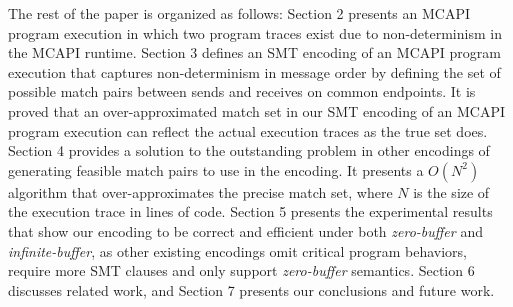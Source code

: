 The rest of the paper is organized as follows:
Section 2 presents an MCAPI program execution in which two program traces exist due to non-determinism in the MCAPI runtime. Section 3 defines an SMT encoding of an MCAPI program execution that captures non-determinism in message order by defining the set of possible match pairs between sends and receives on common endpoints. It is proved that an over-approximated match set in our SMT encoding of an MCAPI program execution can reflect the actual execution traces as the true set does. Section 4 provides a solution to the outstanding problem in other encodings of generating feasible match pairs to use in the encoding. It presents a $O(N^2)$ algorithm that over-approximates the precise match set, where $N$ is the size of the execution trace in lines of code. Section 5 presents the experimental results that show our encoding to be correct and efficient under both \textit{zero-buffer} and \textit{infinite-buffer}, as other existing encodings omit critical program behaviors, require more SMT clauses and only support \textit{zero-buffer} semantics. Section 6 discusses related
work, and Section 7 presents our conclusions and future work.


